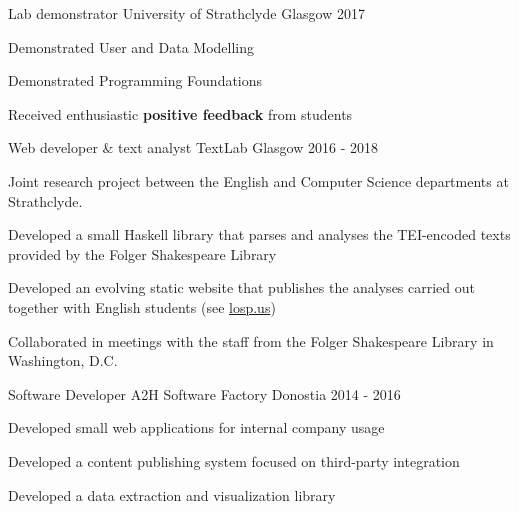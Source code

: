 \documentclass[11pt, a4paper]{awesome-cv}
\begin{document}
\begin{cventries}

    \cventry
      {Lab demonstrator} %
      {University of Strathclyde} %
      {Glasgow} %
      {2017} %
      {
        \begin{cvitems} %
          \item {Demonstrated User and Data Modelling}
          \item {Demonstrated Programming Foundations}
          \item {Received enthusiastic \textbf{positive feedback} from students}
        \end{cvitems}
      }

    \cventry
      {Web developer \& text analyst} %
      {TextLab}
      {Glasgow} %
      {2016 - 2018} %
      {
        Joint research project between the English and Computer Science
        departments at Strathclyde.\vspace{1.1\baselineskip}
        \begin{cvitems} %
          \item {Developed a small Haskell library that parses and analyses the
              TEI-encoded texts provided by the Folger Shakespeare Library}
          \item {Developed an evolving static website that publishes the
              analyses carried out together with English students (see
                \url{losp.us})}
          \item {Collaborated in meetings with the staff from the Folger
              Shakespeare Library in Washington, D.C.}
        \end{cvitems}
      }

    \cventry
      {Software Developer} %
      {A2H Software Factory} %
      {Donostia} %
      {2014 - 2016} %
      {
        \begin{cvitems} %
          \item {Developed small web applications for internal company usage}
          \item {Developed a content publishing system focused on third-party
              integration}
          \item {Developed a data extraction and visualization library}
        \end{cvitems}
      }


\end{cventries}
\end{document}
